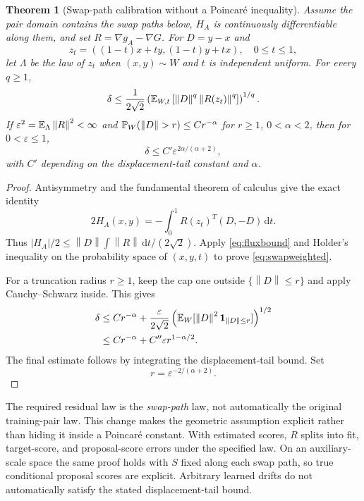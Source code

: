 \documentclass[pdflatex,iicol,sn-mathphys-ay]{sn-jnl}
\newtheorem{theorem}{Theorem}[section]
\theoremstyle{definition}\newtheorem{definition}[theorem]{Definition}
\theoremstyle{remark}\newtheorem{remark}[theorem]{Remark}
\numberwithin{equation}{section}
\newcommand{\norm}[1]{\left\lVert#1\right\rVert}\newcommand{\TV}{\mathrm{TV}}
\newcommand{\dd}{\,\mathrm d}\newcommand{\cA}{c_\alpha}\newcommand{\sg}{\operatorname{sigmoid}}
\newcommand{\1}{\mathbf 1}
\begin{document}
\begin{theorem}[Swap-path calibration without a Poincar\'e inequality]\label{thm:swap}
Assume the pair domain contains the swap paths below, $H_A$ is continuously differentiable along them, and set $R=\nabla g_A-\nabla G$. For $D=y-x$ and
\[
z_t=((1-t)x+ty,(1-t)y+tx),\quad 0\le t\le1,
\]
let $\Lambda$ be the law of $z_t$ when $(x,y)\sim W$ and $t$ is independent uniform. For every $q\ge1$,
\begin{equation}
\delta\le\frac1{2\sqrt2}
\left(\E_{W,t}\left[\norm D^q\norm{R(z_t)}^q\right]\right)^{1/q}.\label{eq:swapweighted}
\end{equation}
If $\varepsilon^2=\E_\Lambda\norm R^2<\infty$ and
$\Prob_W(\norm D>r)\le Cr^{-\alpha}$ for $r\ge1$, $0<\alpha<2$, then for $0<\varepsilon\le1$,
\begin{equation}
\delta\le C'\varepsilon^{2\alpha/(\alpha+2)},\label{eq:swaprate}
\end{equation}
with $C'$ depending on the displacement-tail constant and $\alpha$.
\end{theorem}
\begin{proof}
Antisymmetry and the fundamental theorem of calculus give the exact identity
\begin{equation}
2H_A(x,y)=-\int_0^1R(z_t)^T(D,-D)\dd t.\label{eq:swapidentity}
\end{equation}
Thus $|H_A|/2\le\norm D\int\norm R\dd t/(2\sqrt2)$. Apply \eqref{eq:fluxbound} and Holder's inequality on the probability space of $(x,y,t)$ to prove \eqref{eq:swapweighted}.

For a truncation radius $r\ge1$, keep the cap one outside $\{\norm D\le r\}$ and apply Cauchy--Schwarz inside. This gives
\[
\begin{aligned}
\delta&\le Cr^{-\alpha}+\frac\varepsilon{2\sqrt2}
\left(\E_W[\norm D^2\1_{\norm D\le r}]\right)^{1/2}\\
&\le Cr^{-\alpha}+C''\varepsilon r^{1-\alpha/2}.
\end{aligned}
\]
The final estimate follows by integrating the displace\-ment-tail bound. Set
\[
r=\varepsilon^{-2/(\alpha+2)}.
\]
\end{proof}
The required residual law is the \emph{swap-path} law, not automatically the original training-pair law. This change makes the geometric assumption explicit rather than hiding it inside a Poincar\'e constant. With estimated scores, $R$ splits into fit, target-score, and proposal-score errors under the specified law. On an auxiliary-scale space the same proof holds with $S$ fixed along each swap path, so true conditional proposal scores are explicit. Arbitrary learned drifts do not automatically satisfy the stated displacement-tail bound.
\end{document}

